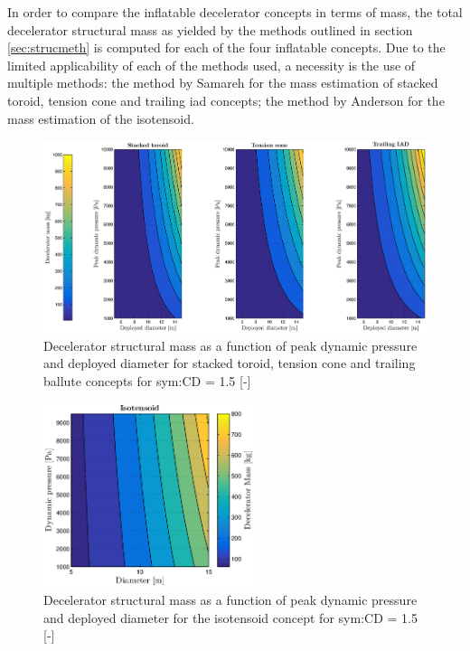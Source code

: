 In order to compare the inflatable decelerator concepts in terms of mass, the total decelerator structural mass as yielded by the methods outlined in section \ref{sec:strucmeth} is computed for each of the four inflatable concepts. Due to the limited applicability of each of the methods used, a necessity is the use of multiple methods: the method by Samareh \cite{Samareh2011} for the mass estimation of stacked toroid, tension cone and trailing \gls{iad} concepts; the method by Anderson \cite{Anderson1969} for the mass estimation of the isotensoid.

\begin{figure}[H]
\hspace{-14mm}
\includegraphics[width = 1.2\textwidth]{Figure/mass_dia_qmax.eps}
\caption{Decelerator structural mass as a function of peak dynamic pressure and deployed diameter for stacked toroid, tension cone and trailing ballute concepts for \gls{sym:CD} = 1.5 [-]}
\label{fig:mass_dia_qmax}
\end{figure}

\begin{figure}[H]
\centering
\includegraphics[width = 0.55\textwidth]{Figure/ISO_comp.eps}
\caption{Decelerator structural mass as a function of peak dynamic pressure and deployed diameter for the isotensoid concept for \gls{sym:CD} = 1.5 [-]}
\label{fig:ISO_comp}
\end{figure}

